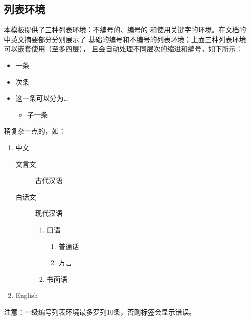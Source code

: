 \subsection{列表环境}\label{subsec:items}
本模板提供了三种列表环境：不编号的、编号的
和使用关键字的环境。在文档的中英文摘要部分分别展示了
基础的编号和不编号的列表环境；上面三种列表环境可以嵌套使用（至多四层），
且会自动处理不同层次的缩进和编号，如下所示：
\begin{itemize}
	\item 一条
	\item 次条
	\item 这一条可以分为\dots
		\begin{itemize}
			\item 子一条
		\end{itemize}
\end{itemize}
稍复杂一点的，如：
\begin{enumerate}
	\item 中文
		\begin{description}
			\item[文言文] 古代汉语
			\item[白话文] 现代汉语
				\begin{enumerate}
					\item 口语
						\begin{enumerate}
							\item 普通话
							\item 方言
						\end{enumerate}
					\item 书面语
				\end{enumerate}
		\end{description}
	\item English
\end{enumerate}

注意：一级编号列表环境最多罗列10条，否则标签会显示错误。%
